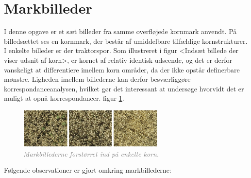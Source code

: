\section{Markbilleder}
I denne opgave er et sæt billeder fra samme overfløjede kornmark anvendt. På billedsættet ses en kornmark, der består af umiddelbare tilfældige kornstrukturer. I enkelte billeder er der traktorspor. Som illustreret i figur <Indsæt billede der viser udsnit af korn>, er kornet af relativ identisk udseende, og det er derfor vanskeligt at differentiere imellem korn områder, da der ikke opstår definerbare mønstre. Ligheden imellem billederne kan derfor besværliggøre korrespondanceanalysen, hvilket gør det interessant at undersøge hvorvidt det er muligt at opnå korrespondancer.
 figur \ref{fig:korn}.
\begin{figure}[H]
    \centering
    \includegraphics[width=0.65\textwidth]{fig/20.png}
     \vspace{-1em}
    \begin{center}    
       \caption{\textcolor{gray}{\footnotesize \textit{Markbillederne forstørret ind på enkelte korn.}}}
    \label{fig:korn}
     \end{center}
     \vspace{-2.5em}
  \end{figure} \noindent
Følgende observationer er gjort omkring markbillederne:
